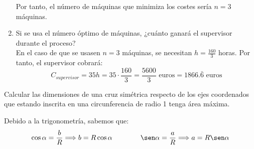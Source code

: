 \begin{ejercicio}
\begin{enumerate}
        Por tanto, el número de máquinas que minimiza los costes sería $n=3$ máquinas.

        
        \item Si se usa el número óptimo de máquinas, ¿cuánto ganará el supervisor durante el proceso?\\

        En el caso de que se usasen $n=3$ máquinas, se necesitan $h=\frac{160}{3}$ horas. Por tanto, el supervisor cobrará:
        $$C_{supervisor} = 35h = 35\cdot \frac{160}{3} = \frac{5600}{3}\text{ euros} = 1866.\bar{6}\text{ euros}$$

        
    \end{enumerate}
\end{ejercicio}

\begin{ejercicio}
    Calcular las dimensiones de una cruz simétrica respecto de los ejes coordenados que estando inscrita en una circunferencia de radio 1 tenga área máxima.
    \begin{figure}[H]
        \centering
    \end{figure}

    Debido a la trigonometría, sabemos que:
    \begin{equation*}
        \cos \alpha = \frac{b}{R} \Longrightarrow b = R\cos \alpha
        \qquad \qquad
        \sen \alpha = \frac{a}{R} \Longrightarrow a = R\sen \alpha
    \end{equation*}


\end{ejercicio}
